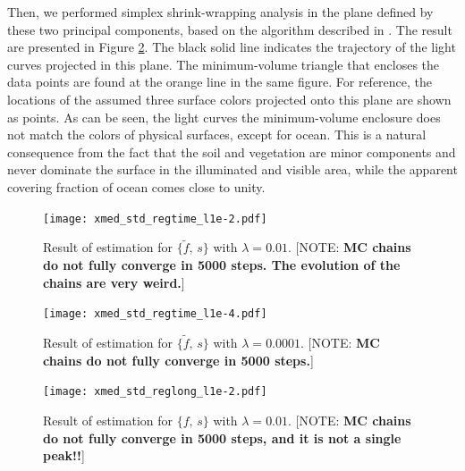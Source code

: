 \documentclass[iop,numberedappendix,apj,]{emulateapj}
\def\fast{\tilde f}
\def\memoYF#1{\color{red}[NOTE: {\bf #1}]\color{black}}
\begin{document}
Then, we performed simplex shrink-wrapping analysis in the plane defined by these two principal components, based on the algorithm described in \citet{Fuhrmann1999}. 
The result are presented in Figure \ref{fig:shrinkwrap}. 
The black solid line indicates the trajectory of the light curves projected in this plane. 
The minimum-volume triangle that encloses the data points are found at the orange line in the same figure. 
For reference, the locations of the assumed three surface colors projected onto this plane are shown as points. 
As can be seen, the light curves the minimum-volume enclosure does not match the colors of physical surfaces, except for ocean. 
This is a natural consequence from the fact that the soil and vegetation are minor components and never dominate the surface in the illuminated and visible area, while the apparent covering fraction of ocean comes close to unity. 



\begin{figure}[!htbp]
    \begin{center}
\texttt{[image: xmed\_std\_regtime\_l1e-2.pdf]}
    \end{center}
    \caption{Result of estimation for $\{ \fast,\,s\}$ with $\lambda = 0.01$. \memoYF{MC chains do not fully converge in 5000 steps. The evolution of the chains are very weird.}}
    \label{fig:shrinkwrap}
\end{figure}


\begin{figure}[!htbp]
    \begin{center}
\texttt{[image: xmed\_std\_regtime\_l1e-4.pdf]}
    \end{center}
    \caption{Result of estimation for $\{ \fast,\,s\}$ with $\lambda = 0.0001$. \memoYF{MC chains do not fully converge in 5000 steps.}}
\label{fig:shrinkwrap}
\end{figure}


\begin{figure}[!htbp]
    \begin{center}
\texttt{[image: xmed\_std\_reglong\_l1e-2.pdf]}
    \end{center}
    \caption{Result of estimation for $\{ f,\,s\}$ with $\lambda = 0.01$. \memoYF{MC chains do not fully converge in 5000 steps, and it is not a single peak!!}}
\label{fig:xmed_std_reglong_l1e-2}
\end{figure}
\end{document}
